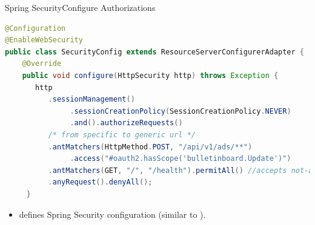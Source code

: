 \begin{frame}[fragile,t]{Spring Security}{Configure Authorizations}
\scriptsize
\begin{lstlisting}[language=java]
@Configuration
@EnableWebSecurity
public class SecurityConfig extends ResourceServerConfigurerAdapter {
	@Override
	public void configure(HttpSecurity http) throws Exception {
       http
          .sessionManagement()
               .sessionCreationPolicy(SessionCreationPolicy.NEVER)
               .and().authorizeRequests()
          /* from specific to generic url */          
          .antMatchers(HttpMethod.POST, "/api/v1/ads/**")
               .access("#oauth2.hasScope('bulletinboard.Update')")
		  .antMatchers(GET, "/", "/health").permitAll() //accepts not-auth users
          .anyRequest().denyAll();
     }
\end{lstlisting} 
\begin{itemize}
	\item {} defines Spring Security configuration
	(similar to ). \\
\end{itemize}
\end{frame}


